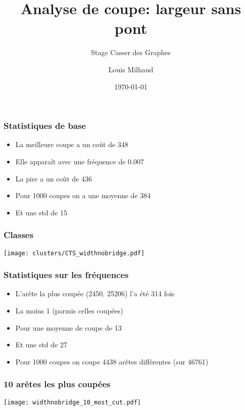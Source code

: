 \documentclass[aspectratio=169]{beamer}
\title{Analyse de coupe: largeur sans pont}
\subtitle{Stage Casser des Graphes}
\author{Louis Milhaud}
\institute{Complex Networks - LIP6}
\date{\today}
\begin{document}
    \begin{frame}
        \titlepage
    \end{frame}

    \begin{frame}
        \frametitle{Statistiques de base}
        
        \begin{itemize}
            \item La meilleure coupe a un coût de 348
            \item Elle apparaît avec une fréquence de 0.007
            \item La pire a un coût de 436
            \item Pour 1000 coupes on a une moyenne de 384
            \item Et une std de 15
        \end{itemize}

    \end{frame}

    \begin{frame}
        \frametitle{Classes}
        \centering
        \texttt{[image: clusters/CTS\_widthnobridge.pdf]}
    \end{frame}

    \begin{frame}
        \frametitle{Statistiques sur les fréquences}
        
        \begin{itemize}
            \item L'arête la plus coupée (2450, 25206) l'a été 314 fois
            \item La moins 1 (parmis celles coupées)
            \item Pour une moyenne de coupe de 13
            \item Et une std de 27
            \item Pour 1000 coupes on coupe 4438 arêtes différentes (sur 46761)
        \end{itemize}
    
    \end{frame}

    \begin{frame}
        \frametitle{10 arêtes les plus coupées}
        \centering
        \texttt{[image: widthnobridge\_10\_most\_cut.pdf]}
    \end{frame}
\end{document}
